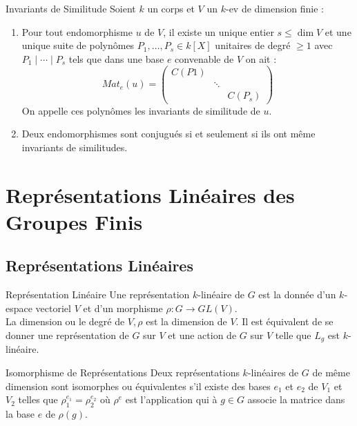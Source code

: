 \documentclass{cours}
\begin{document}
\begin{théorème}{Invariants de Similitude}{}
    Soient $k$ un corps et $V$ un $k$-ev de dimension finie :
    \begin{enumerate}
        \item Pour tout endomorphisme $u$ de $V$, il existe un unique entier $s \leq \dim V$ et une unique suite de polynômes $P_{1}, \ldots, P_{s} \in k[X]$ unitaires de degré $\geq 1$ avec $P_{1} \mid \cdots \mid P_{s}$ tels que dans une base $e$ convenable de $V$ on ait :
              \[
                  Mat_{e}(u) = \begin{pmatrix}
                      C(P1) &        &          \\
                            & \ddots &          \\
                            &        & C(P_{s})
                  \end{pmatrix}
              \]
              On appelle ces polynômes les invariants de similitude de $u$.
        \item Deux endomorphismes sont conjugués si et seulement si ils ont même invariants de similitudes.
    \end{enumerate}
\end{théorème}

\section{Représentations Linéaires des Groupes Finis}
\subsection{Représentations Linéaires}
\begin{définition}{Représentation Linéaire}{}
    Une représentation $k$-linéaire de $G$ est la donnée d'un $k$-espace vectoriel $V$ et d'un morphisme $\rho : G \rightarrow GL(V)$.\\
    La dimension ou le degré de $V, \rho$ est la dimension de $V$. Il est équivalent de se donner une représentation de $G$ sur $V$ et une action de $G$ sur $V$ telle que $L_{g}$ est $k$-linéaire.
\end{définition}

\begin{définition}{Isomorphisme de Représentations}{}
    Deux représentations $k$-linéaires de $G$ de même dimension sont isomorphes ou équivalentes s'il existe des bases $e_{1}$ et $e_{2}$ de $V_{1}$ et $V_{2}$ telles que $\rho_{1}^{e_{1}} = \rho_{2}^{e_{2}}$ où $\rho^{e}$ est l'application qui à $g \in G$ associe la matrice dans la base $e$ de $\rho(g)$.
\end{définition}
\end{document}

